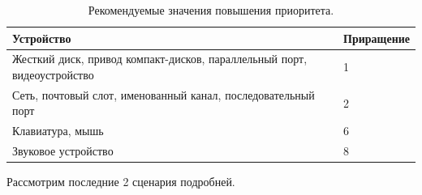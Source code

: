 \documentclass[a4paper,oneside,14pt]{extarticle}
\begin{document}
\begin{table}[h!]
	\caption{Рекомендуемые значения повышения приоритета.}
	\begin{center}
		\begin{tabular}{|p{100mm}|l|}
			\hline
			{Устройство} & {Приращение} \\
			\hline
			Жесткий диск, привод компакт-дисков, параллельный порт, видеоустройство & 1 \\
			\hline
			Сеть, почтовый слот, именованный канал, последовательный порт & 2 \\
			\hline
			Клавиатура, мышь & 6 \\
			\hline
			Звуковое устройство & 8 \\
			\hline
		\end{tabular}
	\end{center}
	\label{tab:io}
\end{table}

Рассмотрим последние 2 сценария подробней. 




\end{document}
